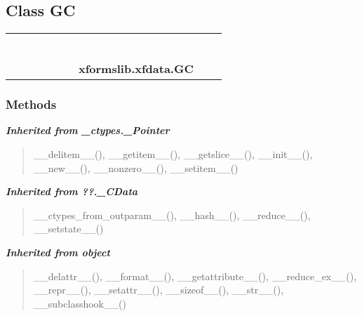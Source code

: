 \subsection{Class GC}

    \label{xformslib:xfdata:GC}
\begin{tabular}{cccccccccc}
\multicolumn{2}{r}{\settowidth{\BCL}{object}\multirow{2}{\BCL}{object}}
&&
&&
&&
  \\\cline{3-3}
  &&\multicolumn{1}{c|}{}
&&
&&
&&
  \\
\multicolumn{4}{r}{\settowidth{\BCL}{??.\_CData}\multirow{2}{\BCL}{??.\_CData}}
&&
&&
  \\\cline{5-5}
  &&&&\multicolumn{1}{c|}{}
&&
&&
  \\
\multicolumn{6}{r}{\settowidth{\BCL}{\_ctypes.\_Pointer}\multirow{2}{\BCL}{\_ctypes.\_Pointer}}
&&
  \\\cline{7-7}
  &&&&&&\multicolumn{1}{c|}{}
&&
  \\
&&&&&&\multicolumn{2}{l}{\textbf{xformslib.xfdata.GC}}
\end{tabular}



  \subsubsection{Methods}


\large{\textbf{\textit{Inherited from \_ctypes.\_Pointer}}}

\begin{quote}
\_\_delitem\_\_(), \_\_getitem\_\_(), \_\_getslice\_\_(), \_\_init\_\_(), \_\_new\_\_(), \_\_nonzero\_\_(), \_\_setitem\_\_()
\end{quote}

\large{\textbf{\textit{Inherited from ??.\_CData}}}

\begin{quote}
\_\_ctypes\_from\_outparam\_\_(), \_\_hash\_\_(), \_\_reduce\_\_(), \_\_setstate\_\_()
\end{quote}

\large{\textbf{\textit{Inherited from object}}}

\begin{quote}
\_\_delattr\_\_(), \_\_format\_\_(), \_\_getattribute\_\_(), \_\_reduce\_ex\_\_(), \_\_repr\_\_(), \_\_setattr\_\_(), \_\_sizeof\_\_(), \_\_str\_\_(), \_\_subclasshook\_\_()
\end{quote}

